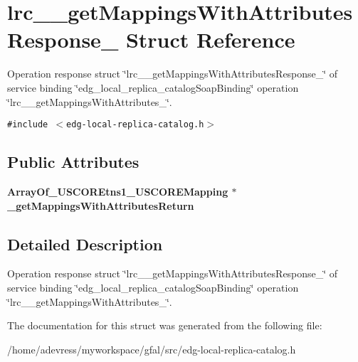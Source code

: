 \section{lrc\_\-\_\-get\-Mappings\-With\-Attributes\-Response\_\- Struct Reference}
\label{structlrc____getMappingsWithAttributesResponse__}
Operation response struct \char`\"{}lrc\_\-\_\-get\-Mappings\-With\-Attributes\-Response\_\-\char`\"{} of service binding \char`\"{}edg\_\-local\_\-replica\_\-catalog\-Soap\-Binding\char`\"{} operation \char`\"{}lrc\_\-\_\-get\-Mappings\-With\-Attributes\_\-\char`\"{}.  


{\tt \#include $<$edg-local-replica-catalog.h$>$}

\subsection*{Public Attributes}
\begin{CompactItemize}
\item 
\bf{Array\-Of\_\-USCOREtns1\_\-USCOREMapping} $\ast$ \textbf{\_\-get\-Mappings\-With\-Attributes\-Return}\label{structlrc____getMappingsWithAttributesResponse___8704a00077e70e5d7d9dd775aad4bb19}

\end{CompactItemize}


\subsection{Detailed Description}
Operation response struct \char`\"{}lrc\_\-\_\-get\-Mappings\-With\-Attributes\-Response\_\-\char`\"{} of service binding \char`\"{}edg\_\-local\_\-replica\_\-catalog\-Soap\-Binding\char`\"{} operation \char`\"{}lrc\_\-\_\-get\-Mappings\-With\-Attributes\_\-\char`\"{}. 



The documentation for this struct was generated from the following file:\begin{CompactItemize}
\item 
/home/adevress/myworkspace/gfal/src/edg-local-replica-catalog.h\end{CompactItemize}
